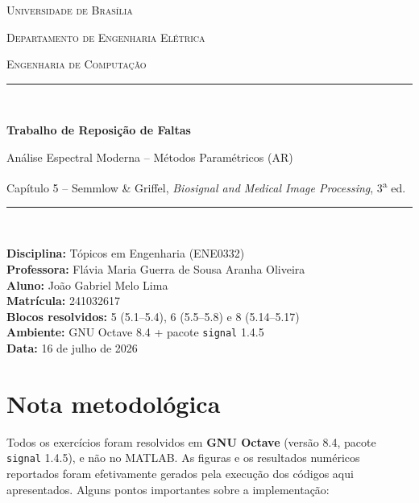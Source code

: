 \documentclass[11pt,a4paper]{article}
\begin{document}
\begin{titlepage}
\centering
\vspace*{1.5cm}
{\scshape\large Universidade de Bras\'ilia\par}
{\scshape Departamento de Engenharia El\'etrica\par}
\vspace{0.4cm}
{\scshape Engenharia de Computa\c{c}\~ao\par}
\vspace{2.5cm}
\rule{\linewidth}{0.5mm}\\[0.4cm]
{\huge\bfseries Trabalho de Reposi\c{c}\~ao de Faltas\par}
\vspace{0.4cm}
{\Large An\'alise Espectral Moderna -- M\'etodos Param\'etricos (AR)\par}
\vspace{0.2cm}
{\large Cap\'itulo 5 -- Semmlow \& Griffel, \textit{Biosignal and Medical Image Processing}, 3\textsuperscript{a} ed.\par}
\rule{\linewidth}{0.5mm}\\[1.5cm]

\begin{flushleft}
\large
\textbf{Disciplina:} T\'opicos em Engenharia (ENE0332)\\[0.3cm]
\textbf{Professora:} Fl\'avia Maria Guerra de Sousa Aranha Oliveira\\[0.3cm]
\textbf{Aluno:} Jo\~ao Gabriel Melo Lima\\[0.3cm]
\textbf{Matr\'icula:} 241032617\\[0.3cm]
\textbf{Blocos resolvidos:} 5 (5.1--5.4), 6 (5.5--5.8) e 8 (5.14--5.17)\\[0.3cm]
\textbf{Ambiente:} GNU Octave 8.4 + pacote \texttt{signal} 1.4.5\\[0.3cm]
\textbf{Data:} 16 de julho de 2026
\end{flushleft}

\vfill
\end{titlepage}

\section{Nota metodol\'ogica}

Todos os exerc\'icios foram resolvidos em \textbf{GNU Octave} (vers\~ao 8.4, pacote
\texttt{signal} 1.4.5), e n\~ao no MATLAB. As figuras e os resultados num\'ericos
reportados foram efetivamente gerados pela execu\c{c}\~ao dos c\'odigos aqui
apresentados. Alguns pontos importantes sobre a implementa\c{c}\~ao:
\end{document}

